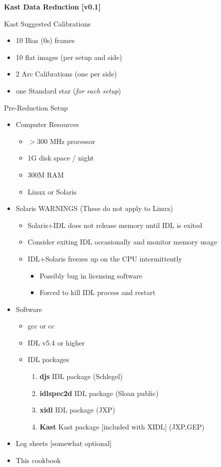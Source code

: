 \documentclass[11pt,letterpaper,dvips]{article}
\begin{document}
 

\begin{center}
{{\huge \bf Kast Data Reduction [v0.1]}}
\end{center}

\begin{enumerate}

{\Large   \item Kast Suggested Calibrations }
   \begin{itemize}
	\item 10 Bias (0s) frames
	\item 10 flat images (per setup and side)
	\item 2 Arc Calibrations (one per side)
	\item one Standard star \quad ({\it for each setup})
   \end{itemize}

{\Large   \item Pre-Reduction Setup }
   \begin{itemize}
	\item Computer Resources
	\begin{itemize}
	  \item $>$300 MHz processor
	  \item 1G disk space / night
	  \item 300M RAM
	  \item Linux or Solaris
	\end{itemize}
	\item Solaris WARNINGS (These do not apply to Linux)
	\begin{itemize}
	  \item Solaris+IDL does not release memory until IDL is exited
	  \item Consider exiting IDL occasionally and monitor memory usage
	  \item IDL+Solaris freezes up on the CPU intermittently
	  \begin{itemize}
		\item Possibly bug in licensing software
		\item Forced to kill IDL process and restart
	  \end{itemize}
	\end{itemize}
	\item Software
	\begin{itemize}
	  \item gcc or cc
	  \item IDL v5.4 or higher
	  \item IDL packages
		\begin{enumerate}
		  \item {\bf djs} IDL package  (Schlegel)
		  \item {\bf idlspec2d} IDL package  (Sloan public)
		  \item {\bf xidl} IDL package   (JXP)
		  \item {\bf Kast} Kast package [included with XIDL]  (JXP,GEP)
		\end{enumerate}
	\end{itemize}
	\item Log sheets [somewhat optional]
	\item This cookbook
   \end{itemize}


\end{enumerate}
\end{document}
